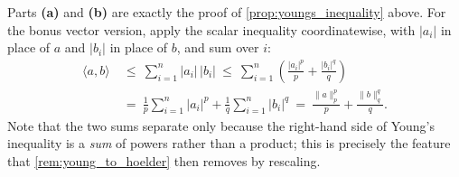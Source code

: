 \begin{exercisesolution}
\label{sol:youngs_inequality}
Parts \textbf{(a)} and \textbf{(b)} are exactly the proof of \cref{prop:youngs_inequality} above.
For the bonus vector version, apply the scalar inequality coordinatewise, with $|a_i|$ in place of
$a$ and $|b_i|$ in place of $b$, and sum over $i$:
\begin{align*}
  \langle a,b\rangle
    &\ \leq\ \sum_{i=1}^n |a_i|\,|b_i|
     \ \leq\ \sum_{i=1}^n \left(\frac{|a_i|^p}{p} + \frac{|b_i|^q}{q}\right) \\[0.4ex]
    &\ =\ \frac{1}{p}\sum_{i=1}^n |a_i|^p + \frac{1}{q}\sum_{i=1}^n |b_i|^q
     \ =\ \frac{\|a\|_p^p}{p} + \frac{\|b\|_q^q}{q}.
\end{align*}
Note that the two sums separate only because the right-hand side of Young's inequality is a
\emph{sum} of powers rather than a product; this is precisely the feature that
\cref{rem:young_to_hoelder} then removes by rescaling.
\end{exercisesolution}
